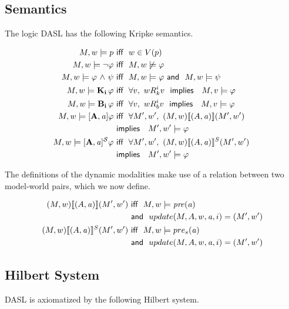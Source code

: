 \subsection{Semantics}
The logic DASL has the following Kripke semantics.
\begin{tcolorbox}
	\begin{align*}
	M,w \models p  &\iiff w \in V(p) \\
	M,w \models \tlnot \varphi  &\iiff M,w \not\models \varphi \\ 
	M,w \models \varphi \tland \psi &\iiff M,w \models \varphi \aand M,w \models \psi \\
	M,w \models \Kns{i}\varphi &\iiff \forall v,\ w\Rel{k}^i v\ \timplies\ M,v \models \varphi \\
	M,w \models \Bels{i}\varphi &\iiff \forall v,\ w\Rel{b}^i v\ \timplies\ M,v \models \varphi \\
	M,w \models \Pal{A,\laa}\varphi &\iiff \forall M',w',\  (M,w) \llbracket (A,\laa) \rrbracket (M',w')\ \\&\timplies\ M',w' \models \varphi \\
	M,w \models \SPal{A,\laa}\varphi &\iiff \forall M',w',\  (M,w) \llbracket (A,\laa) \rrbracket^S (M',w')\ \\&\timplies\ M',w' \models \varphi 
	\end{align*}
\end{tcolorbox}
The definitions of the dynamic modalities make use of a relation between two model-world pairs, which we now define.
\begin{tcolorbox}
	\begin{align*}
	(M,w)\llbracket (A,\mathit{a})\rrbracket (M',w') &\textsf{\ iff \ } M,w \models \mathit{pre}(\mathit{a}) \\&\textsf{\ and \ } update(M,A,w,\mathit{a},i) = (M',w') \\
	(M,w)\llbracket (A,\mathit{a}) \rrbracket^S (M',w') &\textsf{\ iff \ } M,w \models pre_s(\mathit{a}) \\&\textsf{\ and \ } update(M,A,w,\mathit{a}, i) = (M',w') 
	\end{align*}
\end{tcolorbox}


\subsection{Hilbert System}
DASL is axiomatized by the following Hilbert system.\\

